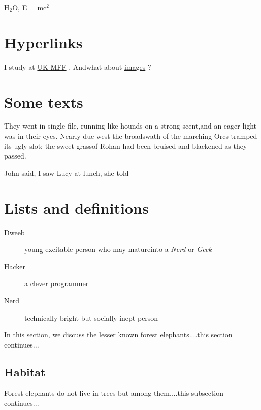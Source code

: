\documentclass{article}
\begin{document}
\par H\(_{2}\)O, E = mc\(^{2}\)
 
\section*{Hyperlinks}
 
\par I study at 
\href{http://www.mff.cuni.cz}{UK MFF}  
. Andwhat about 
\href{#img}{images}  
?
 
\section*{Some texts}
 
\par \begin{center}
They went in single file, running like hounds on a strong scent,and an eager light was in their eyes. Nearly due west the broadswath of the marching \small Orcs tramped\normalsize 
its ugly slot; the sweet grassof Rohan had been bruised and blackened as they passed.\end{center}


\par John said, I saw Lucy at lunch, she told
 
\section*{Lists and definitions}
 \begin{description}
\item[Dweeb] \hspace{1pt} 
young excitable person who may matureinto a \emph{Nerd}
or \emph{Geek}
\item[Hacker] \hspace{1pt} 
a clever programmer\item[Nerd] \hspace{1pt} 
technically bright but socially inept person\end{description}

\par In this section, we discuss the lesser known forest elephants....this section continues...
 
\subsection*{Habitat}
 
\par Forest elephants do not live in trees but among them....this subsection continues... 
 
\end{document}
